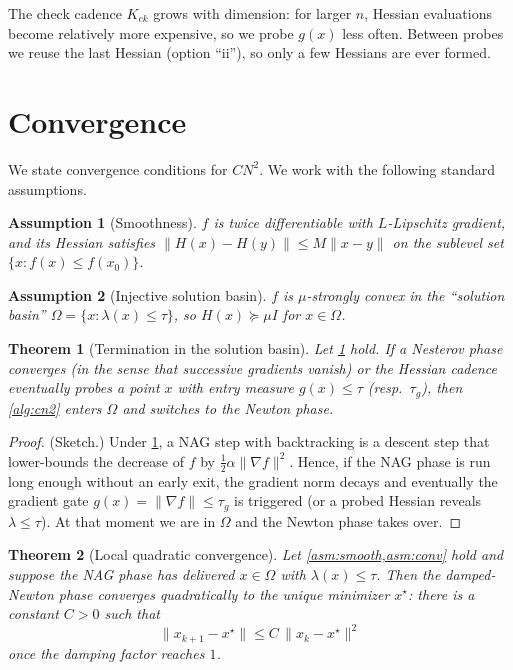 \documentclass[11pt]{article}
\newtheorem{theorem}{Theorem}
\newtheorem{assumption}{Assumption}
\newcommand{\lam}{\lambda}
\newcommand{\grad}{\nabla}
\newcommand{\cn}{CN^2}
\begin{document}
The check cadence $K_{ck}$ grows with dimension: for larger $n$, Hessian evaluations
become relatively more expensive, so we probe $g(x)$ less often. Between probes we reuse
the last Hessian (option ``ii''), so only a few Hessians are ever formed.

\section{Convergence}
\label{sec:theory}

We state convergence conditions for $\cn$. We work with the following standard
assumptions.

\begin{assumption}[Smoothness]
\label{asm:smooth}
$f$ is twice differentiable with $L$-Lipschitz gradient, and its Hessian satisfies
$\|H(x)-H(y)\|\le M\|x-y\|$ on the sublevel set $\{x:f(x)\le f(x_0)\}$.
\end{assumption}

\begin{assumption}[Injective solution basin]
\label{asm:conv}
$f$ is $\mu$-strongly convex in the ``solution basin'' $\Omega=\{x:\lam(x)\le \tau\}$, so
$H(x)\succeq \mu I$ for $x\in\Omega$.
\end{assumption}

\begin{theorem}[Termination in the solution basin]
\label{thm:enter}
Let \cref{asm:smooth} hold. If a Nesterov phase converges (in the sense that successive
gradients vanish) or the Hessian cadence eventually probes a point $x$ with entry measure
$g(x)\le \tau$ (resp.\ $\tau_g$), then \cref{alg:cn2} enters $\Omega$ and switches to the
Newton phase.
\end{theorem}

\begin{proof}
(Sketch.) Under \cref{asm:smooth}, a NAG step with backtracking is a descent step that
lower-bounds the decrease of $f$ by $\tfrac12 \alpha\|\grad f\|^2$. Hence, if the NAG phase
is run long enough without an early exit, the gradient norm decays and eventually the
gradient gate $g(x)=\|\grad f\|\le\tau_g$ is triggered (or a probed Hessian reveals
$\lam\le\tau$). At that moment we are in $\Omega$ and the Newton phase takes over.
\end{proof}

\begin{theorem}[Local quadratic convergence]
\label{thm:quadratic}
Let \cref{asm:smooth,asm:conv} hold and suppose the NAG phase has delivered $x\in\Omega$ with
$\lam(x)\le\tau$. Then the damped-Newton phase converges quadratically to the unique
minimizer $x^\star$: there is a constant $C>0$ such that
\[
\|x_{k+1}-x^\star\|\le C\,\|x_k-x^\star\|^2
\]
once the damping factor reaches $1$.
\end{theorem}
\end{document}
